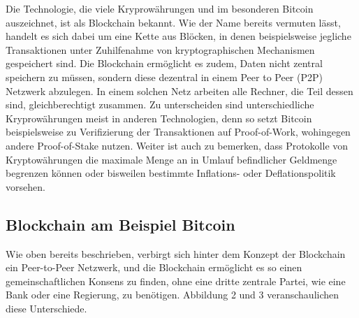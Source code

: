 \documentclass[12pt,oneside]{article}
\begin{document}
Die Technologie, die viele Kryprowährungen und im besonderen Bitcoin auszeichnet, ist als Blockchain bekannt. Wie der Name bereits vermuten lässt, handelt es sich dabei um eine \glqq Kette\grqq{} aus \glqq Blöcken\grqq, in denen beispielsweise jegliche Transaktionen unter Zuhilfenahme von kryptographischen Mechanismen gespeichert sind.\cite[p. 62]{soeteman2019}
Die Blockchain ermöglicht es zudem, Daten nicht zentral speichern zu müssen, sondern diese dezentral in einem Peer to Peer (P2P) Netzwerk  abzulegen. In einem solchen Netz arbeiten alle Rechner, die Teil dessen sind, gleichberechtigt zusammen. Zu unterscheiden sind unterschiedliche Kryprowährungen meist in anderen Technologien, denn  so setzt Bitcoin beispielsweise zu Verifizierung der Transaktionen auf \glqq Proof-of-Work\grqq, wohingegen andere \glqq Proof-of-Stake\grqq{} nutzen. Weiter ist auch zu bemerken, dass Protokolle von Kryptowährungen die maximale Menge an in Umlauf befindlicher Geldmenge begrenzen können oder bisweilen bestimmte Inflations- oder Deflationspolitik vorsehen. \cite{wegner2019}


\subsection{Blockchain am Beispiel Bitcoin}
Wie oben bereits beschrieben, verbirgt sich hinter dem Konzept der Blockchain ein Peer-to-Peer Netzwerk, und die Blockchain ermöglicht es so einen gemeinschaftlichen Konsens zu finden, ohne eine dritte zentrale Partei, wie eine Bank oder eine Regierung, zu benötigen. Abbildung 2 und 3 veranschaulichen diese Unterschiede. 
\end{document}
